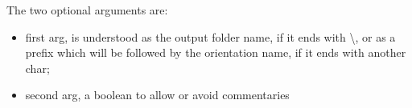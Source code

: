 \vspace{\baselineskip}
The two optional arguments are:
\begin{itemize}
    \item first arg, is understood as the output folder name, if it ends with \textbackslash, or as a prefix which will be followed by the orientation name, if it ends with another char;
    \item second arg, a boolean to allow or avoid commentaries
\end{itemize}